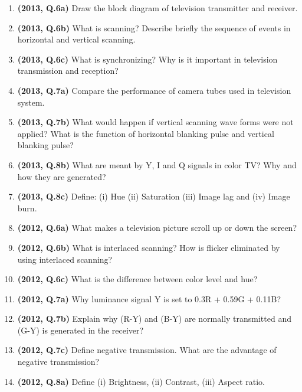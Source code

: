 \documentclass[12pt, a4paper]{article}
\begin{document}
\begin{enumerate}
		\item \textbf{(2013, Q.6a)} Draw the block diagram of television transmitter and receiver.
		
		\item \textbf{(2013, Q.6b)} What is scanning? Describe briefly the sequence of events in horizontal and vertical scanning.
		
		\item \textbf{(2013, Q.6c)} What is synchronizing? Why is it important in television transmission and reception?
		
		\item \textbf{(2013, Q.7a)} Compare the performance of camera tubes used in television system.
		
		\item \textbf{(2013, Q.7b)} What would happen if vertical scanning wave forms were not applied? What is the function of horizontal blanking pulse and vertical blanking pulse?
		
		\item \textbf{(2013, Q.8b)} What are meant by Y, I and Q signals in color TV? Why and how they are generated?
		
		\item \textbf{(2013, Q.8c)} Define: (i) Hue (ii) Saturation (iii) Image lag and (iv) Image burn.
		
		\item \textbf{(2012, Q.6a)} What makes a television picture scroll up or down the screen?
		
		\item \textbf{(2012, Q.6b)} What is interlaced scanning? How is flicker eliminated by using interlaced scanning?
		
		\item \textbf{(2012, Q.6c)} What is the difference between color level and hue?
		
		\item \textbf{(2012, Q.7a)} Why luminance signal Y is set to 0.3R + 0.59G + 0.11B?
		
		\item \textbf{(2012, Q.7b)} Explain why (R-Y) and (B-Y) are normally transmitted and (G-Y) is generated in the receiver?
		
		\item \textbf{(2012, Q.7c)} Define negative transmission. What are the advantage of negative transmission?
		
		\item \textbf{(2012, Q.8a)} Define (i) Brightness, (ii) Contrast, (iii) Aspect ratio.
		

\end{enumerate}
\end{document}
